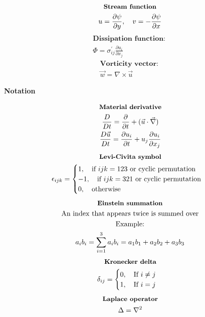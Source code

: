 \documentclass[10pt, a4paper]{article}
\newcommand{\derivative}[2]{\frac{\partial #1}{\partial #2}}
\begin{document}
\begin{multicols*}{2}
\begin{gather*}
    \end{gather*}
    \begin{gather*}
        \textbf{\small Stream function} \\
        u = \derivative{\psi}{y}, \quad v = -\derivative{\psi}{x} %
    \end{gather*}
    \begin{gather*}
        \textbf{Dissipation function: } \\ %
        \Phi = \sigma^{'}_{ij}\derivative{u_{i}}{x_{j}}
    \end{gather*}
    \begin{gather*}
        \textbf{Vorticity vector: } \\ %
        \vec{w} = \nabla \times \vec{u}
    \end{gather*}
\end{multicols*}

\begin{center}
    \Large
    \textbf{Notation}
    \vspace{0.5cm}
\end{center}
\begin{gather*}
    \textbf{\small Material derivative} \\
    \frac{D}{Dt} = \derivative{}{t} + (\vec{u}\cdot \vec{\nabla}) \\ %
    \frac{D\vec{u}}{Dt} = \derivative{u_{i}}{t} + u_{j}\derivative{u_{i}}{x_{j}} 
\end{gather*}
\begin{gather*}
    \textbf{\small Levi-Civita symbol} \\
    \epsilon_{ijk} =
    \begin{cases}
        1, \quad \text{if $ijk = 123$ or cyclic permutation}  \\
        -1, \quad \text{if $ijk = 321$ or cyclic permutation} \\
        0, \quad \text{otherwise}
    \end{cases}
\end{gather*}
\begin{gather*}
    \textbf{\small Einstein summation} \\
    \text{An index that appears twice is summed over} \\
    \text{Example:} \\
    a_i b_i = \sum_{i=1}^3 a_i b_i = a_1 b_1 + a_2 b_2 + a_3 b_3
\end{gather*}
\begin{gather*}
    \textbf{\small Kronecker delta} \\
    \delta_{ij} =
    \begin{cases}
        0, \quad \text{If $i \neq j$} \\
        1, \quad \text{If $i = j$}
    \end{cases}
\end{gather*}
\begin{gather*}
    \textbf{\small Laplace operator} \\
    \Delta = \nabla^2
\end{gather*}
\newpage
\end{document}
